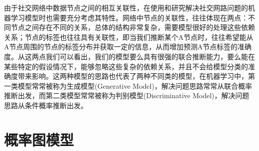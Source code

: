 由于社交网络中数据节点之间的相互关联性，在使用和研究解决社交网路问题的机器学习模型时也需要充分考虑其特性。网络中节点的关联性，往往体现在两点：不同节点之间存在不同的关系，总体的结构非常复杂，需要模型很好的处理这些依赖关系；节点的标签也往往具有关联性，即当我们推断某个A节点时，往往希望能从A节点周围的节点的标签分布并获取一定的信息，从而增加预测A节点标签的准确度。从这两点我们可以看出，我们的模型要么具有很强的联合推断能力，要么能在某些特定的假设情况下，能够忽略这些复杂的依赖关系，并且不会给模型分类的准确度带来影响。这两种模型的思路也代表了两种不同类的模型，在机器学习中，第一类模型常常被称为生成模型(Generative Model)，解决问题思路常常从联合概率推断出发，而第二类模型常常被称为判别模型(Discriminative Model)，解决问题思路从条件概率推断出发。

\section{概率图模型}